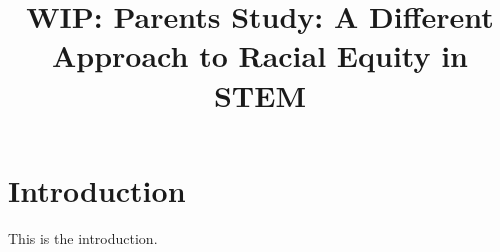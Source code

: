 \documentclass{article}
\begin{document}
\title{WIP: Parents Study:  A Different Approach to Racial Equity in STEM}

\section{Introduction}

This is the introduction.
\end{document}
